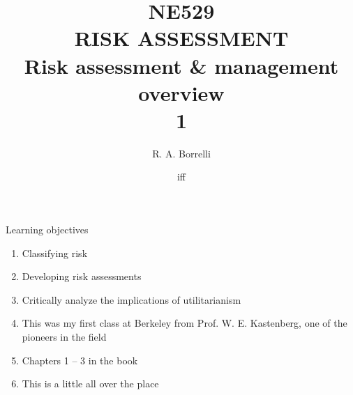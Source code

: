 \documentclass[aspectratio=1610,pdftex,dvipsnames,compress,xcolor={dvipsnames}]{beamer}
\title[NE529 -- Risk Assessment]{NE529\\RISK ASSESSMENT\\Risk assessment \& management overview\\1}
\author[@TheDoctorRAB]{R. A. Borrelli}
\institute[]{
    \acl{ui}\\
    \vspace{0.10in}
    }
\date{\acl{iff}}
\begin{document}
\nobibliography* %


{
    \begin{frame}[plain]{}
        \titlepage
    \end{frame}
}


\begin{frame}{Learning objectives}
    \begin{enumerate}[series=outerlist,topsep=0pt,itemsep=15pt,leftmargin=*,label=(\arabic*)]
        \item[]Classifying risk 
        \item[]Developing risk assessments
        \item[]Critically analyze the implications of utilitarianism 
        \item[]This was my first class at Berkeley from Prof. W. E. Kastenberg, one of the pioneers in the field
        \item[]Chapters 1 -- 3 in the book
        \item[]This is a little all over the place
    \end{enumerate}
\end{frame}
\end{document}
